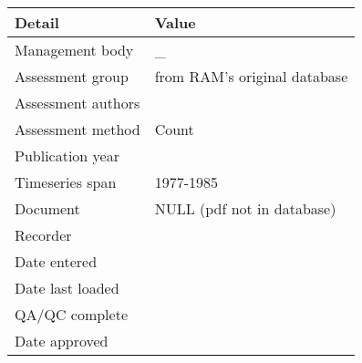 \begin{table}[htb]
\centering
\begin{tabular}{ll}
\toprule
Detail & Value \\
\midrule
Management body    & \_                           \\
Assessment group   & from RAM's original database \\
Assessment authors &                              \\
Assessment method  & Count                        \\
Publication year   &                              \\
Timeseries span    & 1977-1985                    \\
Document           & NULL (pdf not in database)   \\
Recorder           &                              \\
Date entered       &                              \\
Date last loaded   &                              \\
QA/QC complete     &                              \\
Date approved      &                              \\
\bottomrule
\end{tabular}
\label{tab:assessdet}
\end{table}
